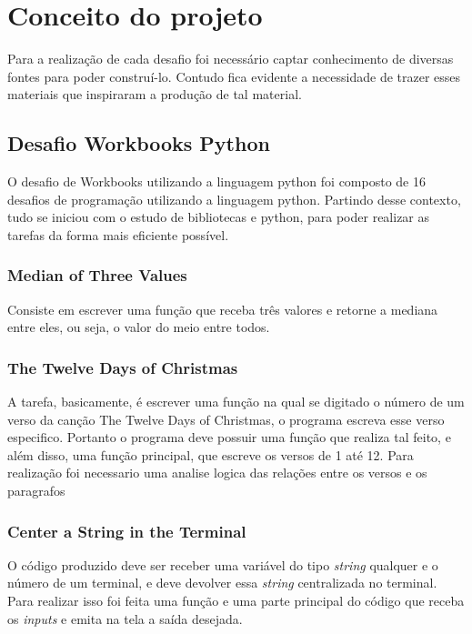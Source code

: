 \chapter{Conceito do projeto}
\label{chap:fundteor}

Para a realização de cada desafio foi necessário captar conhecimento de diversas fontes para poder construí-lo. Contudo fica evidente a necessidade de trazer esses materiais que inspiraram a produção de tal material.

\section{Desafio Workbooks Python}

O desafio de Workbooks utilizando a linguagem python foi composto de 16 desafios de programação utilizando a linguagem python. Partindo desse contexto, tudo se iniciou com o estudo de bibliotecas e python, para poder realizar as tarefas da forma mais eficiente possível.

\subsection{Median of Three Values}

Consiste em escrever uma função que receba três valores e retorne a mediana entre eles, ou seja, o valor do meio entre todos.

\subsection{The Twelve Days of Christmas}

A tarefa, basicamente, é escrever uma função na qual se digitado o número de um verso da canção The Twelve Days of Christmas, o programa escreva esse verso especifico. Portanto o programa deve possuir uma função que realiza tal feito, e além disso, uma função principal, que escreve os versos de 1 até 12. Para realização foi necessario uma analise logica das relações entre os versos e os paragrafos

\subsection{Center a String in the Terminal}

O código produzido deve ser receber uma variável do tipo \textit{string} qualquer e o número de um terminal, e deve devolver essa \textit{string} centralizada no terminal. Para realizar isso foi feita uma função e uma parte principal do código que receba os \textit{inputs} e emita na tela a saída desejada.


